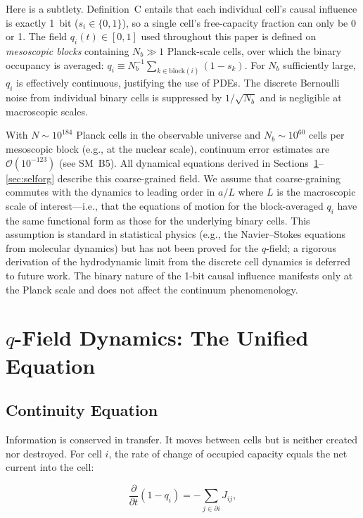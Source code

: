\documentclass[aps,prd,twocolumn,showpacs,superscriptaddress,preprintnumbers]{revtex4-2}
\begin{document}
Here is a subtlety.
Definition~C entails that each individual cell's causal influence is exactly 1~bit ($s_i\in\{0,1\}$), so a single cell's free-capacity fraction can only be 0 or 1.
The field $q_i(t)\in[0,1]$ used throughout this paper is defined on \emph{mesoscopic blocks} containing $N_b\gg 1$ Planck-scale cells, over which the binary occupancy is averaged:
$q_i \equiv N_b^{-1}\sum_{k\in\text{block}(i)}(1-s_k)$.
For $N_b$ sufficiently large, $q_i$ is effectively continuous, justifying the use of PDEs.
The discrete Bernoulli noise from individual binary cells is suppressed by $1/\sqrt{N_b}$ and is negligible at macroscopic scales.

With $N\sim10^{184}$ Planck cells in the observable universe and $N_b\sim10^{60}$ cells per mesoscopic block (e.g., at the nuclear scale), continuum error estimates are $\mathcal{O}(10^{-123})$ (see SM~B5).
All dynamical equations derived in Sections~\ref{sec:dynamics}--\ref{sec:selforg} describe this coarse-grained field. We assume that coarse-graining commutes with the dynamics to leading order in $a/L$ where $L$ is the macroscopic scale of interest---i.e., that the equations of motion for the block-averaged $q_i$ have the same functional form as those for the underlying binary cells. This assumption is standard in statistical physics (e.g., the Navier--Stokes equations from molecular dynamics) but has not been proved for the $q$-field; a rigorous derivation of the hydrodynamic limit from the discrete cell dynamics is deferred to future work. The binary nature of the 1-bit causal influence manifests only at the Planck scale and does not affect the continuum phenomenology.

\section{$q$-Field Dynamics: The Unified Equation}
\label{sec:dynamics}

\subsection{Continuity Equation}

Information is conserved in transfer. It moves between cells but is neither created nor destroyed.
For cell $i$, the rate of change of occupied capacity equals the net current into the cell:

\begin{equation}
\frac{\partial}{\partial t}(1 - q_i) = -\sum_{j \in \partial i} J_{ij},
\label{eq:continuity_raw}
\end{equation}
\end{document}
